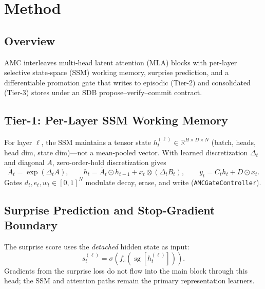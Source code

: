 \section{Method}
\label{sec:method}


\subsection{Overview}

AMC interleaves multi-head latent attention (MLA) blocks with
per-layer selective state-space (SSM) working memory, surprise
prediction, and a differentiable promotion gate that writes to
episodic (Tier-2) and consolidated (Tier-3) stores under an SDB
propose--verify--commit contract.

\subsection{Tier-1: Per-Layer SSM Working Memory}


For layer $\ell$, the SSM maintains a tensor state
$h_t^{(\ell)} \in \mathbb{R}^{H \times D \times N}$ (batch, heads,
head dim, state dim)---not a mean-pooled vector.
With learned discretization $\Delta_t$ and diagonal $A$,
zero-order-hold discretization gives
\begin{equation}
  \bar{A}_t = \exp(\Delta_t A), \qquad
  h_t = \bar{A}_t \odot h_{t-1} + x_t \otimes (\Delta_t B_t), \qquad
  y_t = C_t h_t + D \odot x_t.
\end{equation}
Gates $d_t, e_t, w_t \in [0,1]^N$ modulate decay, erase, and write
(\texttt{AMCGateController}).

\subsection{Surprise Prediction and Stop-Gradient Boundary}


The surprise score uses the \emph{detached} hidden state as input:
\begin{equation}
  s_t^{(\ell)} = \sigma\!\left(f_s\!\left(\operatorname{sg}\!\left[h_t^{(\ell)}\right]\right)\right).
\end{equation}
Gradients from the surprise loss do not flow into the main block through
this head; the SSM and attention paths remain the primary representation learners.

